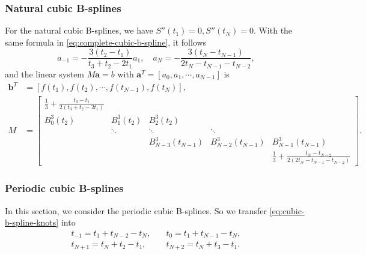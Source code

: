 \documentclass[a4paper]{article}
\theoremstyle{definition}
\begin{document}
\subsubsection{Natural cubic B-splines}
\label{sec:natural-cubic-b-splines}

For the natural cubic B-splines, we have $S''(t_1) = 0, S''(t_N) = 0$. With the same formula in \cref{eq:complete-cubic-b-spline}, it follows 
\begin{equation}
  a_{-1} = -\frac{3(t_2 - t_1)}{t_3 + t_2 - 2t_1} a_1,\quad a_N = -\frac{3(t_N - t_{N - 1})}{2t_N - t_{N - 1} - t_{N - 2}},
  \label{eq:natural-cubic-b-spline-coefficients}
\end{equation}
and the linear system $M\mathbf{a} = b$ with $\mathbf{a}^T = [a_0, a_1, \cdots, a_{N - 1}]$ is 
\begin{equation}
  \begin{aligned}
    \mathbf{b}^T &= [f(t_1), f(t_2), \cdots, f(t_{N - 1}), f(t_N)], \\
    M &= \begin{bmatrix}
      \frac{1}{3} + \frac{t_3 - t_1}{2(t_3 + t_2 - 2t_1)} &    &    &    &    \\
      B_0^3(t_2) & B_1^3(t_2) & B_2^3(t_2) &    &    \\
        & \ddots & \ddots & \ddots &    \\
        &    & B_{N - 3}^3(t_{N - 1}) & B_{N - 2}^3(t_{N - 1}) & B_{N - 1}^3(t_{N - 1}) \\
        &    &    &    & \frac{1}{3} + \frac{t_N - t_{N - 2}}{2(2t_N - t_{N - 1} - t_{N - 2})}
    \end{bmatrix}.
  \end{aligned}
  \label{eq:natural-cubic-b-spline-linear-system}
\end{equation}

\subsubsection{Periodic cubic B-splines}

In this section, we consider the periodic cubic B-splines. So we transfer \cref{eq:cubic-b-spline-knots} into 
\begin{equation}
  \begin{aligned}
    t_{-1} = t_1 + t_{N - 2} - t_N,\quad & t_0 = t_1 + t_{N - 1} - t_N, \\
    t_{N + 1} = t_N + t_2 - t_1,\quad & t_{N + 2} = t_N + t_3 - t_1.
  \end{aligned}
  \label{eq:periodic-cubic-b-spline-knots}
\end{equation}
\end{document}
